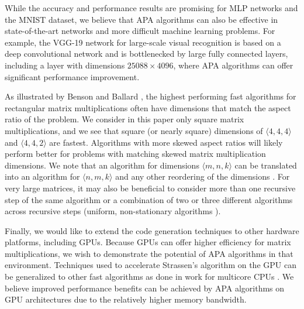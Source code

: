 \documentclass[sigconf,review,anonymous]{acmart}
\newcommand{\dims}[1]{\langle #1 \rangle}
\begin{document}
While the accuracy and performance results are promising for MLP networks and the MNIST dataset, we believe that APA algorithms can also be effective in state-of-the-art networks and more difficult machine learning problems.
For example, the VGG-19 network for large-scale visual recognition \cite{SZ15} is based on a deep convolutional network and is bottlenecked by large fully connected layers, including a layer with dimensions $25088\times 4096$, where APA algorithms can offer significant performance improvement.

As illustrated by Benson and Ballard \cite{BB15}, the highest performing fast algorithms for rectangular matrix multiplications often have dimensions that match the aspect ratio of the problem.
We consider in this paper only square matrix multiplications, and we see that square (or nearly square) dimensions of $\dims{4,4,4}$ and $\dims{4,4,2}$ are fastest.
Algorithms with more skewed aspect ratios will likely perform better for problems with matching skewed matrix multiplication dimensions.
We note that an algorithm for dimensions $\dims{m,n,k}$ can be translated into an algorithm for $\dims{n,m,k}$ and any other reordering of the dimensions \cite{BB15}.
For very large matrices, it may also be beneficial to consider more than one recursive step of the same algorithm or a combination of two or three different algorithms across recursive steps (uniform, non-stationary algorithms \cite{BBDLS16}).

Finally, we would like to extend the code generation techniques to other hardware platforms, including GPUs.
Because GPUs can offer higher efficiency for matrix multiplications, we wish to demonstrate the potential of APA algorithms in that environment.
Techniques used to accelerate Strassen's algorithm on the GPU \cite{HYvdG20,LAES13} can be generalized to other fast algorithms as done in work for multicore CPUs \cite{BB15,HRMvdG17}.
We believe improved performance benefits can be achieved by APA algorithms on GPU architectures due to the relatively higher memory bandwidth.



%


\balance


\end{document}
